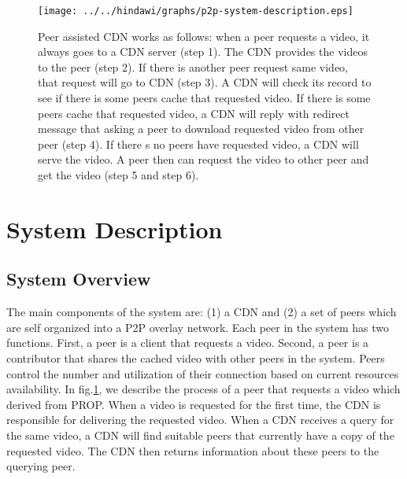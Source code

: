 \begin{figure}[!t]
\begin{center}
\texttt{[image: ../../hindawi/graphs/p2p-system-description.eps]}
\end{center}
\caption{Peer assisted CDN works as follows:
when a peer requests a video, it always goes to a CDN server (step 1). 
The CDN provides the videos to the peer (step 2). 
If there is another peer request same video, that request will go to CDN (step 3).  
A CDN will check its record to see if there is some peers cache that requested video.  
If there is some peers cache that requested video, a CDN will reply with redirect message that asking a peer to download requested video from other peer (step 4).
If there s no peers have requested video, a CDN will serve the video.   
A peer then can request the video to other peer and get the video (step 5 and step 6).
}
\label{fig:p2pcdninteractioninsimulator}
\end{figure} 





\section{System Description}\label{systemdescription}
\subsection{System Overview}\label{systemoverview}
The main components of the system are: (1) a CDN and (2) a set of peers which are self organized into a P2P overlay network.
Each peer in the system has two functions.
First, a peer is a client that requests a video. 
Second, a peer is a contributor that shares the cached video with other peers in the system. 
Peers control the number and utilization of their connection based on current resources availability.
In fig.\ref{fig:p2pcdninteractioninsimulator}, we describe the process of a peer that requests a video which derived from PROP.
When a video is requested for the first time, the CDN is responsible for delivering the requested video.
When a CDN receives a query for the same video, a CDN will find suitable peers that currently have a copy of the requested video.
The CDN then returns information about these peers to the querying peer.


